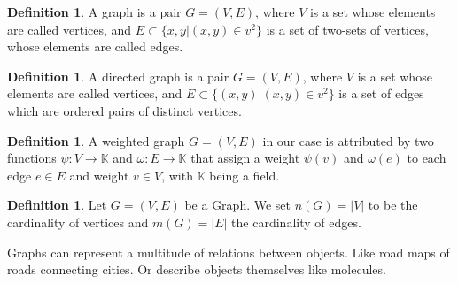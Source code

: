 \documentclass{article}
\theoremstyle{definition}
\newtheorem{definition}[theorem]{Definition}
\begin{document}
\begin{definition}
A graph is a pair $G = (V, E)$, where $V$ is a set whose elements are called vertices, and $E \subset \{ {x, y}|(x,y) \in v^{2} \}$ is a set of two-sets of vertices, whose elements are called edges.
\end{definition}

\begin{definition}
A directed graph is a pair $G = (V, E)$, where $V$ is a set whose elements are called vertices, and $E \subset \{ (x, y)|(x,y) \in v^{2} \}$ is a set of edges which are ordered pairs of distinct vertices.
\end{definition}

\begin{definition}
A weighted graph $G = (V, E)$ in our case is attributed by two functions $\psi : V \to \mathbb{K}$ and $\omega : E \to \mathbb{K}$ that assign a weight $\psi(v)$ and $\omega(e)$ to each edge $e \in E$ and weight $v \in V$, with $\mathbb{K}$ being a field.
\end{definition}

\begin{definition}
Let $G = (V, E)$ be a Graph. We set $n(G) = |V|$ to be the cardinality of vertices and $m(G) = |E|$ the cardinality of edges.
\end{definition}

Graphs can represent a multitude of relations between objects. Like road maps of roads connecting cities. Or describe objects themselves like molecules.
\end{document}
